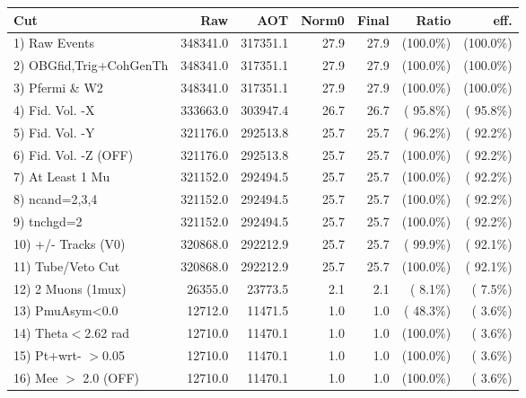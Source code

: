 \begin{table}[h!]\centering
 \begin{tabular}{||l||r|r|r|r|r|r||}
 \hline
 \hline
 Cut & Raw & AOT & Norm0 & Final & Ratio & eff.       \\
 \hline
  1) Raw Events           &     348341.0 &     317351.1 &         27.9 &         27.9 & (100.0\%) & (100.0\%) \\
  2) OBGfid,Trig+CohGenTh &     348341.0 &     317351.1 &         27.9 &         27.9 & (100.0\%) & (100.0\%) \\
  3) Pfermi \& W2         &     348341.0 &     317351.1 &         27.9 &         27.9 & (100.0\%) & (100.0\%) \\
  4) Fid. Vol. -X         &     333663.0 &     303947.4 &         26.7 &         26.7 & ( 95.8\%) & ( 95.8\%) \\
  5) Fid. Vol. -Y         &     321176.0 &     292513.8 &         25.7 &         25.7 & ( 96.2\%) & ( 92.2\%) \\
  6) Fid. Vol. -Z (OFF)   &     321176.0 &     292513.8 &         25.7 &         25.7 & (100.0\%) & ( 92.2\%) \\
  7) At Least 1 Mu        &     321152.0 &     292494.5 &         25.7 &         25.7 & (100.0\%) & ( 92.2\%) \\
  8) ncand=2,3,4          &     321152.0 &     292494.5 &         25.7 &         25.7 & (100.0\%) & ( 92.2\%) \\
  9) tnchgd=2             &     321152.0 &     292494.5 &         25.7 &         25.7 & (100.0\%) & ( 92.2\%) \\
 10) +/- Tracks (V0)      &     320868.0 &     292212.9 &         25.7 &         25.7 & ( 99.9\%) & ( 92.1\%) \\
 11) Tube/Veto Cut        &     320868.0 &     292212.9 &         25.7 &         25.7 & (100.0\%) & ( 92.1\%) \\
 12) 2 Muons (1mux)       &      26355.0 &      23773.5 &          2.1 &          2.1 & (  8.1\%) & (  7.5\%) \\
 13) PmuAsym<0.0          &      12712.0 &      11471.5 &          1.0 &          1.0 & ( 48.3\%) & (  3.6\%) \\
 14) Theta$<$2.62 rad     &      12710.0 &      11470.1 &          1.0 &          1.0 & (100.0\%) & (  3.6\%) \\
 15) Pt+wrt- $>$0.05      &      12710.0 &      11470.1 &          1.0 &          1.0 & (100.0\%) & (  3.6\%) \\
 16) Mee $>$ 2.0  (OFF)   &      12710.0 &      11470.1 &          1.0 &          1.0 & (100.0\%) & (  3.6\%) \\

\end{tabular}
\end{table}
